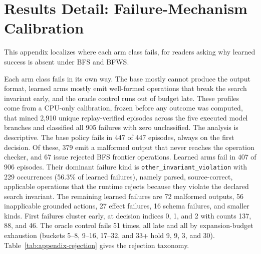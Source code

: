 \section{Results Detail: Failure-Mechanism Calibration}
\label{app:results-failures}
\label{sec:results-failures}

This appendix localizes where each arm class fails, for readers asking why learned success is absent under BFS and BFWS.

Each arm class fails in its own way. The base mostly cannot produce the output format, learned arms mostly emit well-formed operations that break the search invariant early, and the oracle control runs out of budget late. These profiles come from a CPU-only calibration, frozen before any outcome was computed, that mined 2,910 unique replay-verified episodes across the five executed model branches and classified all 905 failures with zero unclassified. The analysis is descriptive. The base policy fails in 447 of 447 episodes, always on the first decision. Of these, 379 emit a malformed output that never reaches the operation checker, and 67 issue rejected BFS frontier operations. Learned arms fail in 407 of 906 episodes. Their dominant failure kind is \texttt{other\_invariant\_violation} with 229 occurrences (56.3\% of learned failures), namely parsed, source-correct, applicable operations that the runtime rejects because they violate the declared search invariant. The remaining learned failures are 72 malformed outputs, 56 inapplicable grounded actions, 27 effect failures, 16 schema failures, and smaller kinds. First failures cluster early, at decision indices 0, 1, and 2 with counts 137, 88, and 46. The oracle control fails 51 times, all late and all by expansion-budget exhaustion (buckets 5--8, 9--16, 17--32, and 33+ hold 9, 9, 3, and 30). Table~\ref{tab:appendix-rejection} gives the rejection taxonomy.

